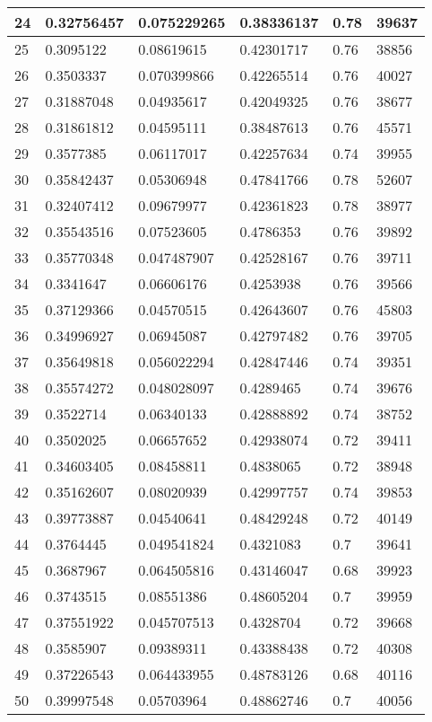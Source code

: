 \begin{longtable}{|l|l|l|l|l|l|}
24 & 0.32756457 & 0.075229265 & 0.38336137 & 0.78 & 39637 \\ \hline 
25 & 0.3095122 & 0.08619615 & 0.42301717 & 0.76 & 38856 \\ \hline 
26 & 0.3503337 & 0.070399866 & 0.42265514 & 0.76 & 40027 \\ \hline 
27 & 0.31887048 & 0.04935617 & 0.42049325 & 0.76 & 38677 \\ \hline 
28 & 0.31861812 & 0.04595111 & 0.38487613 & 0.76 & 45571 \\ \hline 
29 & 0.3577385 & 0.06117017 & 0.42257634 & 0.74 & 39955 \\ \hline 
30 & 0.35842437 & 0.05306948 & 0.47841766 & 0.78 & 52607 \\ \hline 
31 & 0.32407412 & 0.09679977 & 0.42361823 & 0.78 & 38977 \\ \hline 
32 & 0.35543516 & 0.07523605 & 0.4786353 & 0.76 & 39892 \\ \hline 
33 & 0.35770348 & 0.047487907 & 0.42528167 & 0.76 & 39711 \\ \hline 
34 & 0.3341647 & 0.06606176 & 0.4253938 & 0.76 & 39566 \\ \hline 
35 & 0.37129366 & 0.04570515 & 0.42643607 & 0.76 & 45803 \\ \hline 
36 & 0.34996927 & 0.06945087 & 0.42797482 & 0.76 & 39705 \\ \hline 
37 & 0.35649818 & 0.056022294 & 0.42847446 & 0.74 & 39351 \\ \hline 
38 & 0.35574272 & 0.048028097 & 0.4289465 & 0.74 & 39676 \\ \hline 
39 & 0.3522714 & 0.06340133 & 0.42888892 & 0.74 & 38752 \\ \hline 
40 & 0.3502025 & 0.06657652 & 0.42938074 & 0.72 & 39411 \\ \hline 
41 & 0.34603405 & 0.08458811 & 0.4838065 & 0.72 & 38948 \\ \hline 
42 & 0.35162607 & 0.08020939 & 0.42997757 & 0.74 & 39853 \\ \hline 
43 & 0.39773887 & 0.04540641 & 0.48429248 & 0.72 & 40149 \\ \hline 
44 & 0.3764445 & 0.049541824 & 0.4321083 & 0.7 & 39641 \\ \hline 
45 & 0.3687967 & 0.064505816 & 0.43146047 & 0.68 & 39923 \\ \hline 
46 & 0.3743515 & 0.08551386 & 0.48605204 & 0.7 & 39959 \\ \hline 
47 & 0.37551922 & 0.045707513 & 0.4328704 & 0.72 & 39668 \\ \hline 
48 & 0.3585907 & 0.09389311 & 0.43388438 & 0.72 & 40308 \\ \hline 
49 & 0.37226543 & 0.064433955 & 0.48783126 & 0.68 & 40116 \\ \hline 
50 & 0.39997548 & 0.05703964 & 0.48862746 & 0.7 & 40056 \\ \hline 
\end{longtable}
